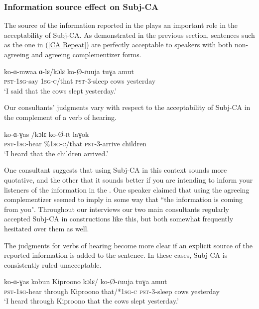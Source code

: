 \documentclass[output=paper,newtxmath,modfonts,nonflat,hidelinks]{langsci/langscibook}
\begin{document}
\subsubsection{Information source effect on Subj-CA}

The source of the information reported in the  plays an important role in the acceptability of Subj-CA. As demonstrated in the previous section, sentences such as the one in (\ref{CA Repeat}) are perfectly acceptable to speakers with both non-agreeing and agreeing complementizer forms.

\ea \label{CA Repeat}
\gll	ko-ɑ-mwaa ɑ-lɛ/kɔlɛ ko-\O-ɾuuja tuɣa amut \\
\textsc{pst}-1\textsc{sg}-say 1\textsc{sg-c}/that \textsc{pst}-3-sleep cows yesterday \\
\glt `I said that the cows slept yesterday.'
\z

\noindent Our consultants' judgments vary with respect to the acceptability of Subj-CA in the complement of a verb of hearing.  

\ea
\gll ko-ɑ-ɣas /kɔlɛ ko-\O-ɪt laɣok \\
\textsc{pst}-1\textsc{sg}-hear \%1\textsc{sg-c}/that \textsc{pst}-3-arrive children \\
\glt `I heard that the children arrived.'
\z

\noindent One consultant suggests that using Subj-CA in this context sounds more quotative, and the other that it sounds better if you are intending to inform your listeners of the information in the . One speaker claimed that using the agreeing complementizer seemed to imply in some way that ``the information is coming from you". Throughout our interviews our two main consultants regularly accepted Subj-CA in constructions like this, but both somewhat frequently hesitated over them as well. 

The judgments for verbs of hearing become more clear if an explicit source of the reported information is added to the sentence. In these cases, Subj-CA is consistently ruled unacceptable.  

\ea 
\gll ko-ɑ-ɣas kobun Kiproono kɔlɛ/ ko-\O-ɾuuja tuɣa amut \\
\textsc{pst}-1\textsc{sg}-hear through Kiproono that/*1\textsc{sg-c} \textsc{pst}-3-sleep cows yesterday \\
\trans `I heard through Kiproono that the cows slept yesterday.' 
\z
\end{document}
